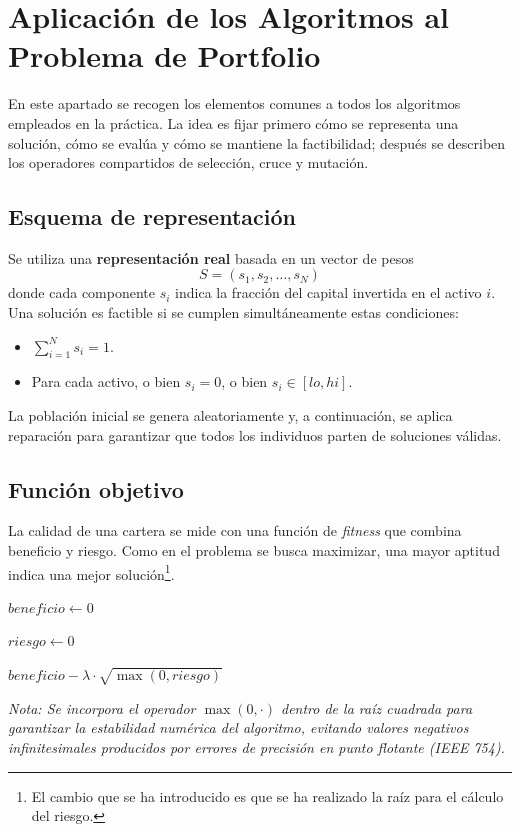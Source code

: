 \section{Aplicación de los Algoritmos al Problema de Portfolio}
\label{sec:aplicacion}

En este apartado se recogen los elementos comunes a todos los algoritmos empleados en la práctica. La idea es fijar primero cómo se representa una solución, cómo se evalúa y cómo se mantiene la factibilidad; después se describen los operadores compartidos de selección, cruce y mutación.

\subsection{Esquema de representación}
Se utiliza una \textbf{representación real} basada en un vector de pesos
$$
S = (s_1, s_2, \dots, s_N)
$$
donde cada componente $s_i$ indica la fracción del capital invertida en el activo $i$. Una solución es factible si se cumplen simultáneamente estas condiciones:
\begin{itemize}
    \item $\sum_{i=1}^N s_i = 1$.
    \item Para cada activo, o bien $s_i = 0$, o bien $s_i \in [lo, hi]$.
\end{itemize}

La población inicial se genera aleatoriamente y, a continuación, se aplica reparación para garantizar que todos los individuos parten de soluciones válidas.

\subsection{Función objetivo}
La calidad de una cartera se mide con una función de \textit{fitness} que combina beneficio y riesgo. Como en el problema se busca maximizar, una mayor aptitud indica una mejor solución\footnote{El cambio que se ha introducido es que se ha realizado la raíz para el cálculo del riesgo.}.

\begin{algorithm}[H]
\SetAlgoLined
{}

$beneficio \leftarrow 0$


$riesgo \leftarrow 0$


\Return $beneficio - \lambda \cdot \sqrt{\max(0, riesgo)}$
\caption{Evaluación de una solución}
\end{algorithm}
\textit{Nota: Se incorpora el operador $\max(0, \cdot)$ dentro de la raíz cuadrada para garantizar la estabilidad numérica del algoritmo, evitando valores negativos infinitesimales producidos por errores de precisión en punto flotante (IEEE 754).}

